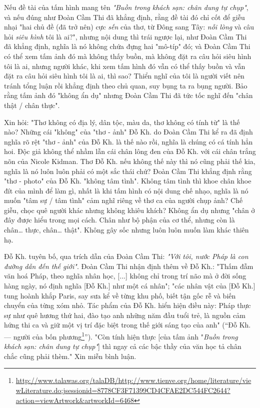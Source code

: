 \documentclass[../main.tex]{subfiles}
\begin{document}
\begin{multicols}{2}
Nếu đề tài của tấm hình mang tên \textit{"Buồn trong khách sạn: chân dung tự chụp"}, và nếu đúng như Đoàn Cầm Thi đã khẳng định, rằng đề tài đó chỉ cốt để giễu nhại "hai chủ đề (đã trở nên) cực \textit{sến} của thơ, từ Đông sang Tây: \textit{nỗi lòng} và câu hỏi \textit{siêu hình} tôi là ai?", nhưng nội dung thì trái ngược lại, như Đoàn Cầm Thi đã khẳng định, nghĩa là nó không chứa đựng hai "mô-típ" đó; và Đoàn Cầm Thi có thể xem tấm ảnh đó mà không thấy buồn, mà không đặt ra câu hỏi siêu hình tôi là ai, nhưng người khác, khi xem tấm hình đó vẫn có thể thấy buồn và vẫn đặt ra câu hỏi siêu hình tôi là ai, thì sao? Thiển nghĩ của tôi là người viết nên tránh tổng luận rồi khẳng định theo chủ quan, suy bụng ta ra bụng người. Bảo rằng tấm ảnh đó "không ẩn dụ" nhưng Đoàn Cầm Thi đã tức tốc nghĩ đến "chân thật / chân thực".  
 
Xin hỏi: "Thơ không có địa lý, dân tộc, màu da, thơ không có tính từ" là thế nào? Những cái "không" của "thơ - ảnh" Đỗ Kh. do Đoàn Cầm Thi kể ra đã định nghĩa rõ rệt "thơ - ảnh" của Đỗ Kh. là thế nào rồi, nghĩa là chúng có cá tính hẳn hoi. Độc giả không thể nhầm lẫn cái chân lông đen của Đỗ Kh. với cái chân trắng nõn của Nicole Kidman. Thơ Đỗ Kh. nếu không thế này thì nó cũng phải thế kia, nghĩa là nó luôn luôn phải có một sắc thái chứ? Đoàn Cầm Thi khẳng định rằng "thơ - photo" của Đỗ Kh. "không tâm tình". Không tâm tình thì khoe chân khoe đít của mình để làm gì, nhất là khi tấm hình có nội dung chế nhạo, nghĩa là nó muốn "tâm sự / tâm tình" cảm nghĩ riêng về thơ ca của người chụp ảnh? Chế giễu, chọc quê người khác nhưng không khiêu khích? Không ẩn dụ nhưng "chân ở đây được hiểu trong mọi cách. Chân như bộ phận của cơ thể, nhưng còn là chân… thực, chân… thật". Không gây sốc nhưng luôn luôn muốn làm khác thiên hạ. 
 
Đỗ Kh. tuyên bố, qua trích dẫn của Đoàn Cầm Thi: \textit{"Với tôi, nước Pháp là con đường dẫn đến thế giới"}. Đoàn Cầm Thi nhận định thêm về Đỗ Kh.: "Thấm đẫm văn hoá Pháp, theo nghĩa nhân học, [...] không chỉ trong trí não mà ở đời sống hàng ngày, nó định nghĩa [Đỗ Kh.] như một cá nhân"; "các nhân vật của [Đỗ Kh.] tung hoành khắp Paris, say sưa kể về từng khu phố, biết tận gốc rễ và biến chuyển của từng xóm nhỏ. Tác phẩm của Đỗ Kh. hiển hiện điều này: Pháp thực sự như quê hương thứ hai, đào tạo anh những năm đầu tuổi trẻ, là nguồn cảm hứng thi ca và giữ một vị trí đặc biệt trong thế giới sáng tạo của anh" (“Đỗ Kh. — người của bốn phương\footnote{\url{http://www.talawas.org/talaDB/http://www.tienve.org/home/literature/viewLiterature.do;jsessionid=8778CF3F71399CD4CFAE2DC544FC2644?action=viewArtwork&artworkId=6468}}”). "Còn tính hiện thực [của tấm ảnh "\textit{Buồn trong khách sạn: chân dung tự chụp"}] thì ngay cả các bậc thầy của văn học tả chân chắc cũng phải thèm." Xin miễn bình luận. 
 

\end{multicols}
\end{document}
